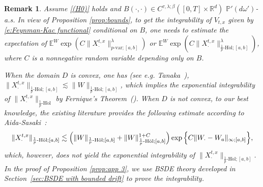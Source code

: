 \documentclass[11pt,reqno]{amsart}
\def\E{\mathbb E}
\newtheorem{remark}{Remark}[section]
\numberwithin{equation}{section}
\begin{document}
\begin{remark}\label{rem:prob-fk} Assume \ref{(H0)} holds and $B(\cdot,\cdot)\in C^{\tau,\lambda;\beta}([0,T]\times\mathbb{R}^{d})$ $\mathbb{P}'(d \omega')$-a.s.  In view of Proposition \ref{prop:bounds}, to get the integrability of $V_{t,x}$ given by \eqref{e:Feynman-Kac functional} conditional on $B$, one needs to estimate the expectation of $\E^W \exp\left(C \|X^{t,x}_{\cdot}\|^\lambda_{p\text{-}\mathrm{var};[a,b]}\right)$ or $\E^W\exp\left(C \|X^{t,x}_{\cdot}\|^\lambda_{\frac1p\text{-}\mathrm{H\ddot ol};[a,b]}\right)$,  where $C$ is a nonnegative random variable depending only on $B$. 


When the domain $D$ is convex, one has (see e.g. Tanaka~\cite[Lemma~2.6]{tanaka1979stochastic}), $\|X^{t,x}_{\cdot}\|_{\frac{1}{p}\text{-}\mathrm{H\ddot ol};[a,b]}\lesssim  \|W\|_{\frac{1}{p}\text{-}\mathrm{H\ddot ol};[a,b]}$, which implies the exponential integrability of  $\|X^{t,x}_{\cdot}\|_{\frac{1}{p}\text{-}\mathrm{H\ddot ol}}$ by  Fernique's Theorem~(\cite{fernique}). When $D$ is not convex, to our best knowledge,  the existing literature provides the following estimate according to Aida-Sasaki~\cite[Lemma~2.3]{aida2013wong}:
\begin{equation}\label{e:X<=exp{W}}
\|X^{t,x}_{\cdot}\|_{\frac{1}{p}\text{-}\mathrm{H\ddot ol};[a,b]}\lesssim \left(\|W\|_{\frac{1}{p}\text{-}\mathrm{H\ddot ol};[a,b]}+ \|W\|^{1+C}_{\frac{1}{p}\text{-}\mathrm{H\ddot ol};[a,b]}\right)\exp\Big\{C\|W_{\cdot} - W_{a}\|_{\infty;[a,b]}\Big\},
\end{equation}
which, however, does not yield the exponential integrability of $\|X^{t,x}_{\cdot}\|_{\frac{1}{p}\text{-}\mathrm{H\ddot ol};[a,b]}$. In the proof of Proposition \ref{prop:app 3}, we use BSDE theory developed in Section~\ref{sec:BSDE with bounded drift} to prove the integrability.
\end{remark}
\end{document}
